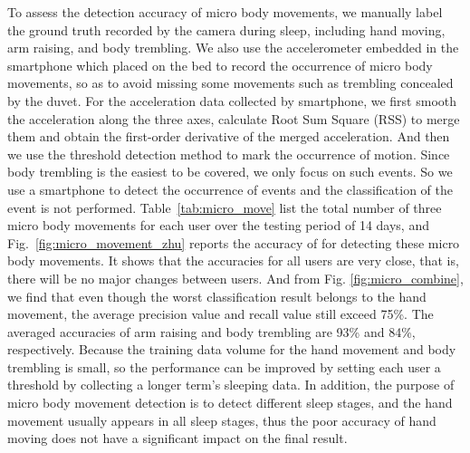 To assess the detection accuracy of micro body movements, we manually label the ground truth recorded by the camera during sleep, including hand moving, arm raising, and body trembling. We also use the accelerometer embedded in the smartphone which placed on the bed to record the occurrence of micro body movements, so as to avoid missing some movements such as trembling concealed by the duvet. For the acceleration data collected by smartphone, we first smooth the acceleration along the three axes, calculate Root Sum Square (RSS) to merge them and obtain the first-order derivative of the merged acceleration. And then we use the threshold detection method to mark the occurrence of motion. Since body trembling is the easiest to be covered, we only focus on such events. So we use a smartphone to detect the occurrence of events and the classification of the event is not performed. Table~\ref{tab:micro_move} list the total number of three micro body movements for each user over the testing period of 14 days, and Fig.~\ref{fig:micro_movement_zhu} reports the accuracy of {\systemname} for detecting these micro body movements. It shows that the accuracies for all users are very close, that is, there will be no major changes between users. And from Fig. \ref{fig:micro_combine}, we find that even though the worst classification result belongs to the hand movement, the average precision value and recall value still exceed 75\%. The averaged accuracies of arm raising and body trembling are 93\% and 84\%, respectively. Because the training data volume for the hand movement and body trembling is small, so the performance can be improved by setting each user a threshold by collecting a longer term's sleeping data. In addition, the purpose of micro body movement detection is to detect different sleep stages, and the hand movement usually appears in all sleep stages, thus the poor accuracy of hand moving does not have a significant impact on the final result.


